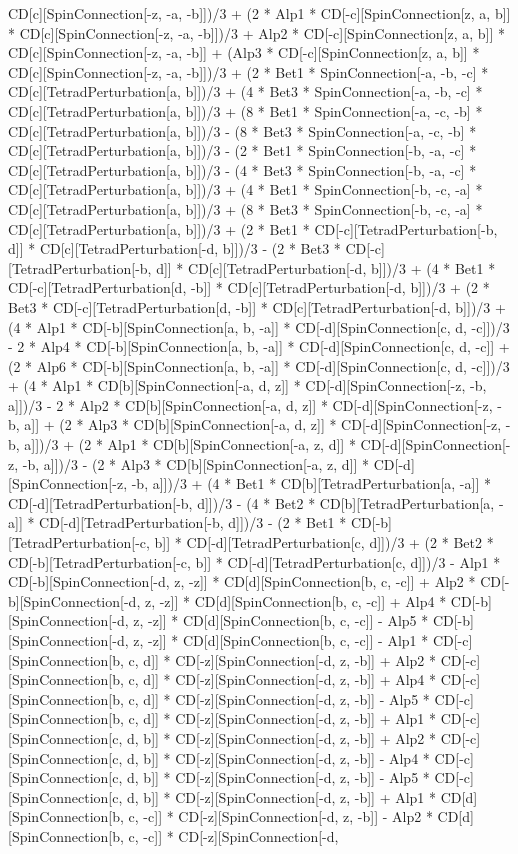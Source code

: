 CD[c][SpinConnection[-z, -a, -b]])/3 + (2 * Alp1 * CD[-c][SpinConnection[z, a, b]] * CD[c][SpinConnection[-z, -a, -b]])/3 + Alp2 * CD[-c][SpinConnection[z, a, b]] * CD[c][SpinConnection[-z, -a, -b]] + (Alp3 * CD[-c][SpinConnection[z, a, b]] * CD[c][SpinConnection[-z, -a, -b]])/3 + (2 * Bet1 * SpinConnection[-a, -b, -c] * CD[c][TetradPerturbation[a, b]])/3 + (4 * Bet3 * SpinConnection[-a, -b, -c] * CD[c][TetradPerturbation[a, b]])/3 + (8 * Bet1 * SpinConnection[-a, -c, -b] * CD[c][TetradPerturbation[a, b]])/3 - (8 * Bet3 * SpinConnection[-a, -c, -b] * CD[c][TetradPerturbation[a, b]])/3 - (2 * Bet1 * SpinConnection[-b, -a, -c] * CD[c][TetradPerturbation[a, b]])/3 - (4 * Bet3 * SpinConnection[-b, -a, -c] * CD[c][TetradPerturbation[a, b]])/3 + (4 * Bet1 * SpinConnection[-b, -c, -a] * CD[c][TetradPerturbation[a, b]])/3 + (8 * Bet3 * SpinConnection[-b, -c, -a] * CD[c][TetradPerturbation[a, b]])/3 + (2 * Bet1 * CD[-c][TetradPerturbation[-b, d]] * CD[c][TetradPerturbation[-d, b]])/3 - (2 * Bet3 * CD[-c][TetradPerturbation[-b, d]] * CD[c][TetradPerturbation[-d, b]])/3 + (4 * Bet1 * CD[-c][TetradPerturbation[d, -b]] * CD[c][TetradPerturbation[-d, b]])/3 + (2 * Bet3 * CD[-c][TetradPerturbation[d, -b]] * CD[c][TetradPerturbation[-d, b]])/3 + (4 * Alp1 * CD[-b][SpinConnection[a, b, -a]] * CD[-d][SpinConnection[c, d, -c]])/3 - 2 * Alp4 * CD[-b][SpinConnection[a, b, -a]] * CD[-d][SpinConnection[c, d, -c]] + (2 * Alp6 * CD[-b][SpinConnection[a, b, -a]] * CD[-d][SpinConnection[c, d, -c]])/3 + (4 * Alp1 * CD[b][SpinConnection[-a, d, z]] * CD[-d][SpinConnection[-z, -b, a]])/3 - 2 * Alp2 * CD[b][SpinConnection[-a, d, z]] * CD[-d][SpinConnection[-z, -b, a]] + (2 * Alp3 * CD[b][SpinConnection[-a, d, z]] * CD[-d][SpinConnection[-z, -b, a]])/3 + (2 * Alp1 * CD[b][SpinConnection[-a, z, d]] * CD[-d][SpinConnection[-z, -b, a]])/3 - (2 * Alp3 * CD[b][SpinConnection[-a, z, d]] * CD[-d][SpinConnection[-z, -b, a]])/3 + (4 * Bet1 * CD[b][TetradPerturbation[a, -a]] * CD[-d][TetradPerturbation[-b, d]])/3 - (4 * Bet2 * CD[b][TetradPerturbation[a, -a]] * CD[-d][TetradPerturbation[-b, d]])/3 - (2 * Bet1 * CD[-b][TetradPerturbation[-c, b]] * CD[-d][TetradPerturbation[c, d]])/3 + (2 * Bet2 * CD[-b][TetradPerturbation[-c, b]] * CD[-d][TetradPerturbation[c, d]])/3 - Alp1 * CD[-b][SpinConnection[-d, z, -z]] * CD[d][SpinConnection[b, c, -c]] + Alp2 * CD[-b][SpinConnection[-d, z, -z]] * CD[d][SpinConnection[b, c, -c]] + Alp4 * CD[-b][SpinConnection[-d, z, -z]] * CD[d][SpinConnection[b, c, -c]] - Alp5 * CD[-b][SpinConnection[-d, z, -z]] * CD[d][SpinConnection[b, c, -c]] - Alp1 * CD[-c][SpinConnection[b, c, d]] * CD[-z][SpinConnection[-d, z, -b]] + Alp2 * CD[-c][SpinConnection[b, c, d]] * CD[-z][SpinConnection[-d, z, -b]] + Alp4 * CD[-c][SpinConnection[b, c, d]] * CD[-z][SpinConnection[-d, z, -b]] - Alp5 * CD[-c][SpinConnection[b, c, d]] * CD[-z][SpinConnection[-d, z, -b]] + Alp1 * CD[-c][SpinConnection[c, d, b]] * CD[-z][SpinConnection[-d, z, -b]] + Alp2 * CD[-c][SpinConnection[c, d, b]] * CD[-z][SpinConnection[-d, z, -b]] - Alp4 * CD[-c][SpinConnection[c, d, b]] * CD[-z][SpinConnection[-d, z, -b]] - Alp5 * CD[-c][SpinConnection[c, d, b]] * CD[-z][SpinConnection[-d, z, -b]] + Alp1 * CD[d][SpinConnection[b, c, -c]] * CD[-z][SpinConnection[-d, z, -b]] - Alp2 * CD[d][SpinConnection[b, c, -c]] * CD[-z][SpinConnection[-d, 